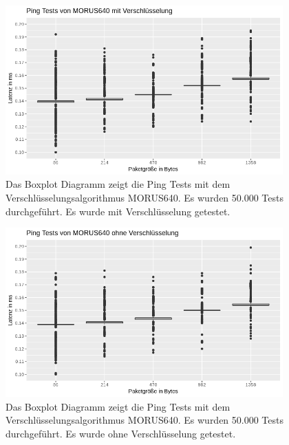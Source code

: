 \begin{figure}[!p]
\centering
\includegraphics[width=0.95\textwidth]{images/moruseping.png}
\caption[Ping Diagramm mit MORUS640 mit Verschlüsselung]{Das Boxplot Diagramm zeigt die Ping Tests mit dem Verschlüsselungsalgorithmus MORUS640. Es wurden 50.000 Tests durchgeführt. Es wurde mit Verschlüsselung getestet.   }
\label{img:CPU-WE6}
\end{figure}
\begin{figure}[!p]
\centering
\includegraphics[width=0.95\textwidth]{images/Morusweping.png}
\caption[Ping Diagramm mit MORUS640 ohne Verschlüsselung]{Das Boxplot Diagramm zeigt die Ping Tests mit dem Verschlüsselungsalgorithmus MORUS640. Es wurden 50.000 Tests durchgeführt. Es wurde ohne Verschlüsselung getestet.  }
\label{img:CPU-WE7}
\end{figure}
